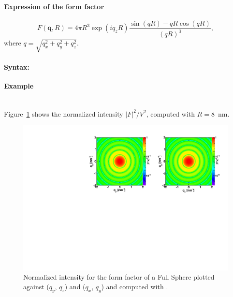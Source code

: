 \paragraph{Expression of the form factor}
\begin{equation*}
F(\mathbf{q},R) = 4\pi R^3 \exp(iq_z R)\frac{\sin(q R) - q R \cos(q R)}{(qR)^3},
\end{equation*}
where $q=\sqrt{q_x^2 + q_y^2 + q_z^2}$.

\paragraph{Syntax:} 

\newpage

\paragraph{Example}\mbox{}\\
Figure~\ref{fig:FFfSphereEx} shows the normalized intensity $|F|^2/V^2$, computed with $R=8$~nm.
\begin{figure}[ht]
\begin{center}
\includegraphics[angle=-90,width=\textwidth]{Figures/ff/figfffsphere.pdf}
\end{center}
\caption{Normalized intensity for the
  form factor of a Full Sphere plotted against ($q_y$, $q_z$) and ($q_x$, $q_y$) and computed with .}
\label{fig:FFfSphereEx}
\end{figure}


\newpage
